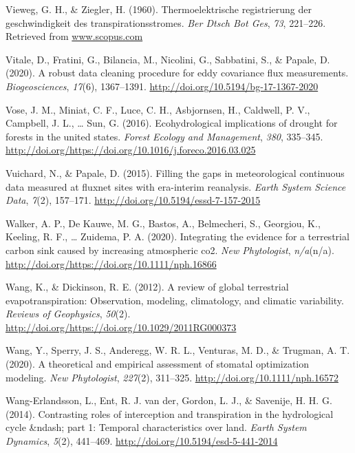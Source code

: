 \documentclass[11pt,twoside]{reedthesis}
\begin{document}
\hypertarget{ref-Vieweg1960}{}
Vieweg, G. H., \& Ziegler, H. (1960). Thermoelektrische registrierung
der geschwindigkeit des transpirationsstromes. \emph{Ber Dtsch Bot Ges},
\emph{73}, 221--226. Retrieved from \url{www.scopus.com}

\hypertarget{ref-Vitale2020}{}
Vitale, D., Fratini, G., Bilancia, M., Nicolini, G., Sabbatini, S., \&
Papale, D. (2020). A robust data cleaning procedure for eddy covariance
flux measurements. \emph{Biogeosciences}, \emph{17}(6), 1367--1391.
\url{http://doi.org/10.5194/bg-17-1367-2020}

\hypertarget{ref-Vose2016}{}
Vose, J. M., Miniat, C. F., Luce, C. H., Asbjornsen, H., Caldwell, P.
V., Campbell, J. L., \ldots{} Sun, G. (2016). Ecohydrological
implications of drought for forests in the united states. \emph{Forest
Ecology and Management}, \emph{380}, 335--345.
\url{http://doi.org/https://doi.org/10.1016/j.foreco.2016.03.025}

\hypertarget{ref-Vuichard2015}{}
Vuichard, N., \& Papale, D. (2015). Filling the gaps in meteorological
continuous data measured at fluxnet sites with era-interim reanalysis.
\emph{Earth System Science Data}, \emph{7}(2), 157--171.
\url{http://doi.org/10.5194/essd-7-157-2015}

\hypertarget{ref-Walker2020}{}
Walker, A. P., De Kauwe, M. G., Bastos, A., Belmecheri, S., Georgiou,
K., Keeling, R. F., \ldots{} Zuidema, P. A. (2020). Integrating the
evidence for a terrestrial carbon sink caused by increasing atmospheric
co2. \emph{New Phytologist}, \emph{n/a}(n/a).
\url{http://doi.org/https://doi.org/10.1111/nph.16866}

\hypertarget{ref-WangDickinson2012}{}
Wang, K., \& Dickinson, R. E. (2012). A review of global terrestrial
evapotranspiration: Observation, modeling, climatology, and climatic
variability. \emph{Reviews of Geophysics}, \emph{50}(2).
\url{http://doi.org/https://doi.org/10.1029/2011RG000373}

\hypertarget{ref-Wang2020}{}
Wang, Y., Sperry, J. S., Anderegg, W. R. L., Venturas, M. D., \&
Trugman, A. T. (2020). A theoretical and empirical assessment of
stomatal optimization modeling. \emph{New Phytologist}, \emph{227}(2),
311--325. \url{http://doi.org/10.1111/nph.16572}

\hypertarget{ref-Wang-Erlandsson2014}{}
Wang-Erlandsson, L., Ent, R. J. van der, Gordon, L. J., \& Savenije, H.
H. G. (2014). Contrasting roles of interception and transpiration in the
hydrological cycle \&ndash; part 1: Temporal characteristics over land.
\emph{Earth System Dynamics}, \emph{5}(2), 441--469.
\url{http://doi.org/10.5194/esd-5-441-2014}
\end{document}
